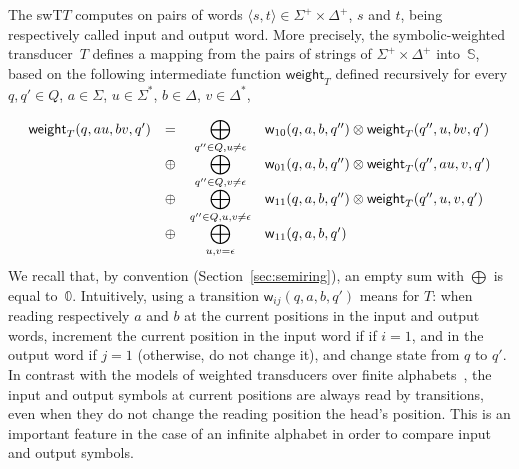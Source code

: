 \documentclass[runningheads]{llncs}
\def\<#1>{\langle #1 \rangle}
\newcommand{\Semiring}{\mathbb{S}}
\newcommand{\zero}{\mathbb{0}}
\newcommand{\one}{\mathbb{1}}
\def\SWT{\textsf{swT}\xspace}
\def\weight{\mathsf{weight}}
\def\wei{\mathsf{w}}
\def\final{\mathsf{out}}
\begin{document}
\noindent 
The \SWT $T$ computes on pairs of words $\< s, t> \in \Sigma^+ \times \Delta^+$,
$s$ and $t$, being respectively called input and output word.
%
More precisely, the symbolic-weighted transducer~$T$ defines a mapping 
from the pairs of strings of $\Sigma^+ \times \Delta^+$ 
into~$\Semiring$,
based on the following intermediate function $\weight_T$
defined recursively for every $q, q' \in Q$, 
$a \in \Sigma$, $u \in \Sigma^*$, $b\in \Delta$, $v\in \Delta^*$, 

\begin{equation}
\begin{array}[t]{lccl}
\weight_T(q, au, bv, q') & = & 
             \displaystyle\bigoplus_{q'' \in Q, u \neq \epsilon} &
    \wei_{10}(q, a, b, q'') \otimes \weight_T(q'', u, bv, q')\\
  & \oplus & \displaystyle\bigoplus_{q'' \in Q, v \neq \epsilon} &
    \wei_{01}(q, a, b, q'') \otimes \weight_T(q'', au, v, q')\\
  & \oplus & \displaystyle\bigoplus_{q'' \in Q, u,v \neq \epsilon} &
    \wei_{11}(q, a, b, q'') \otimes \weight_T(q'', u, v, q')\\
  & \oplus & \displaystyle\bigoplus_{u,v = \epsilon} &
    \wei_{11}(q, a, b, q')
\end{array}
\label{eq:SWT-weight}
\end{equation}
%
We recall that, by convention (Section~\ref{sec:semiring}), 
an empty sum with $\bigoplus$ is equal to~$\zero$. 
%
Intuitively, using a transition $\wei_{ij}(q, a, b, q')$ means for $T$:
when reading respectively $a$ and $b$ at the current positions in the input and output words, 
increment the current position in the input word if if $i = 1$, 
and in the output word if $j = 1$ (otherwise, do not change it),
and change state from $q$ to $q'$.
%
In contrast with the models of weighted transducers over finite alphabets~\cite{Mohri03ijfcs},
the input and output symbols at current positions are always read by transitions, 
even when they do not change the reading position the head's position.
This is an important feature in the case of an infinite alphabet in 
order to compare input and output symbols.
\end{document}
